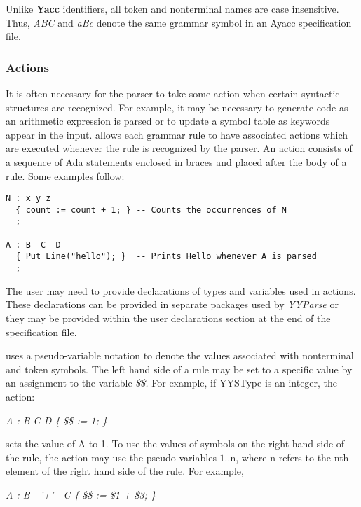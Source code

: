 Unlike {\bf Yacc} identifiers, all token and nonterminal names
are case insensitive.  Thus,
{\it ABC}
and
{\it aBc}
denote the same
grammar symbol in an Ayacc specification file.
\subsubsection{Actions}
It is often necessary for the parser to take some action
when certain syntactic structures are recognized.  For example,
it may be necessary to generate code as an
arithmetic expression is parsed or to update a symbol
table as keywords appear in the input.  \ayacc allows each grammar
rule to have associated actions
which are executed whenever the rule is recognized by the
parser.  An action consists of a sequence of Ada statements
enclosed in braces and placed after the body of a rule.  Some
examples follow:
\begin{verbatim}
N : x y z
  { count := count + 1; } -- Counts the occurrences of N
  ;

A : B  C  D
  { Put_Line("hello"); }  -- Prints Hello whenever A is parsed
  ;
\end{verbatim}

The user may need to provide declarations of types and variables
used in actions.  These declarations can be provided in separate
packages used by
{\it YYParse}
or they may be provided within the user declarations section at
the end of the specification file.

\ayacc uses a pseudo-variable notation to denote the values
associated with nonterminal and token symbols.  The left hand side
of a rule may be set to a specific value by an assignment to the variable
{\it \$\$.}
For example, if YYSType is an integer, the action:

\begin{center}
{\it A : B C D \{ \$\$ := 1; \}}
\end{center}

\noindent sets the value of A to 1.  To use the values of symbols on
the right hand side of the rule, the action may use the
pseudo-variables $1..$n, where n refers to the nth
element of the right hand side of the rule.  For example,

\begin{center}
{\it A : B\ \ '+'\ \ C \{ \$\$ := \$1 + \$3; \}}
\end{center}

